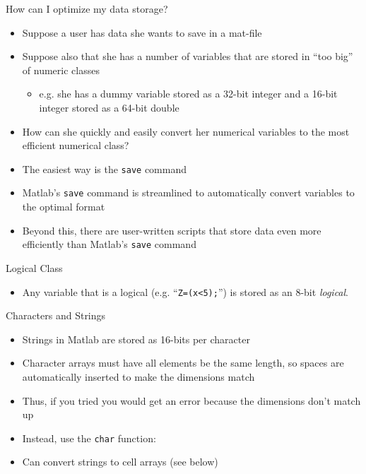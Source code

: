 \documentclass[english,xcolor=dvipsnames]{beamer}
\begin{document}
\begin{frame}{How can I optimize my data storage?}
\begin{itemize}
\item Suppose a user has data she wants to save in a mat-file
\item Suppose also that she has a number of variables that are stored in
{}``too big'' of numeric classes
\begin{itemize}
\item e.g. she has a dummy variable stored as a 32-bit integer and a 16-bit
integer stored as a 64-bit double
\end{itemize}
\item How can she quickly and easily convert her numerical variables to
the most efficient numerical class?
\item The easiest way is the \texttt{save} command
\item Matlab's \texttt{save} command is streamlined to automatically convert
variables to the optimal format
\item Beyond this, there are user-written scripts that store data even more
efficiently than Matlab's \texttt{save} command
\end{itemize}
\end{frame}


\begin{frame}{Logical Class}
\begin{itemize}
\item Any variable that is a logical (e.g. {}``\texttt{Z=(x<5);}'') is
stored as an 8-bit \emph{logical}.
\end{itemize}
\end{frame}


\begin{frame}{Characters and Strings}
\begin{itemize}
\item Strings in Matlab are stored as 16-bits per character
\item Character arrays must have all elements be the same length, so spaces
are automatically inserted to make the dimensions match
\item Thus, if you tried %
you would get an error because the dimensions don't match up
\item Instead, use the \texttt{char} function:\\
\item Can convert strings to cell arrays (see below)
\end{itemize}
\end{frame}
\end{document}
